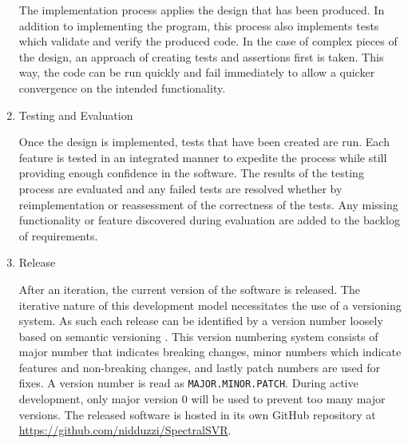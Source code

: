 \begin{enumerate}
            The implementation process applies the design that has been produced. In addition to implementing the program, this process also implements tests which validate and verify the produced code. In the case of complex pieces of the design, an approach of creating tests and assertions first is taken. This way, the code can be run quickly and fail immediately to allow a quicker convergence on the intended functionality.

      \item Testing and Evaluation

            Once the design is implemented, tests that have been created are run. Each feature is tested in an integrated manner to expedite the process while still providing enough confidence in the software. The results of the testing process are evaluated and any failed tests are resolved whether by reimplementation or reassessment of the correctness of the tests. Any missing functionality or feature discovered during evaluation are added to the backlog of requirements.

      \item Release

            After an iteration, the current version of the software is released. The iterative nature of this development model necessitates the use of a versioning system. As such each release can be identified by a version number loosely based on semantic versioning \autocite{preston-wernerSemanticVersioning200}. This version numbering system consists of major number that indicates breaking changes, minor numbers which indicate features and non-breaking changes, and lastly patch numbers are used for fixes. A version number is read as \verb|MAJOR.MINOR.PATCH|. During active development, only major version 0 will be used to prevent too many major versions. The released software is hosted in its own GitHub repository at \url{https://github.com/nidduzzi/SpectralSVR}.

\end{enumerate}

